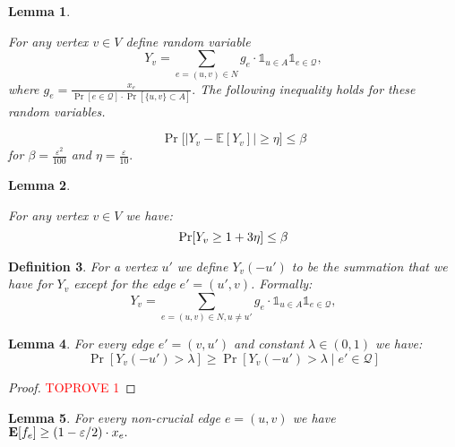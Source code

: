 \documentclass[letterpaper,11pt]{article}
\renewcommand{\epsilon}{\varepsilon}
\DeclareMathOperator{\E}{\ensuremath{\normalfont \textbf{E}}}
\renewcommand{\epsilon}[0]{\ensuremath{\varepsilon}}
\let\originalleft\left
\let\originalright\right
\renewcommand{\left}{\mathopen{}\mathclose\bgroup\originalleft}
\renewcommand{\right}{\aftergroup\egroup\originalright}
\newtheorem{lemma}{Lemma}[section]
\newtheorem{definition}[lemma]{Definition}
\begin{document}
\newcommand{\besttau}{\ensuremath{\frac{1}{\epsilon t}}\xspace}
\newcommand{\besttQAlg}{\ensuremath{\frac{1}{\delta^2 p_{min} \epsilon^{3}}}\xspace}
\newcommand{\Inf}{\ensuremath{I}\xspace}




\newcommand{\difffrommu}{\ensuremath{\epsilon}\xspace}
\newcommand{\lemboundedy}[0]{
For any vertex  $v\in V$ define random variable $$Y_v = \sum_{e=(u,v) \in N} g_{e} \cdot\mathds{1}_{u\in A}  \mathds{1}_{e\in \mathcal{Q}}, $$
where $g_e=\frac{x_e}{\Pr[e \in \mathcal{Q}]\cdot\Pr[\{u, v\} \subset A]}.$
The following inequality holds for these random variables.

$$\Pr\Big[|Y_v - \mathbb{E}[Y_v]| \geq \eta \Big] \leq \beta$$
 for $\beta= \frac{\epsilon^2}{100}$ and $\eta=\frac{\epsilon}{10}.$
 
}

\begin{lemma}
\label{lem:boundedvary}
\lemboundedy
\end{lemma}

\newcommand{\lemyvaboutone}[0]{
 For any vertex $v\in  V$ we have:
    $$
     \Pr\left[ Y_v\geq 1+3\eta\right]\leq \beta
    $$
}

\begin{lemma}
\label{lem:yvclose1}
\lemyvaboutone
\end{lemma}


\begin{definition}
    For a vertex $u'$ we define $Y_v(-u')$ to be the summation that we have for $Y_v$ except for the edge $e' = (u', v)$. Formally:
    $$Y_v = \sum_{e=(u,v) \in N, u \neq u'} g_{e} \cdot\mathds{1}_{u\in A}  \mathds{1}_{e\in \mathcal{Q}}, $$
\end{definition}
\newcommand{\Aset}{\ensuremath{\bm{A}}\xspace}
\newcommand{\qstar}{\ensuremath{\mathcal{Q}}\xspace}
\newcommand{\rva}{\ensuremath{S_A}\xspace}
\newcommand{\rvq}{\ensuremath{S_Q}\xspace}
\newcommand{\Cov}{\ensuremath{Cov}\xspace}

\begin{lemma}\label{lem:condeinQlowerbound}
    For every edge $e' = (v, u')$ and constant $\lambda \in (0,1)$ we have:
    $$\Pr[Y_v(-u') > \lambda] \geq \Pr[Y_v(-u') > \lambda \mid e' \in \mathcal{Q}]$$
\end{lemma}

\begin{proof}\textcolor{red}{TOPROVE 1}\end{proof}


\begin{lemma}\label{lemma:expweight}
For every non-crucial edge $e = (u, v)$ we have $\E[f_e] \geq (1 - \epsilon/2) \cdot x_e.$   
\end{lemma}
\end{document}
